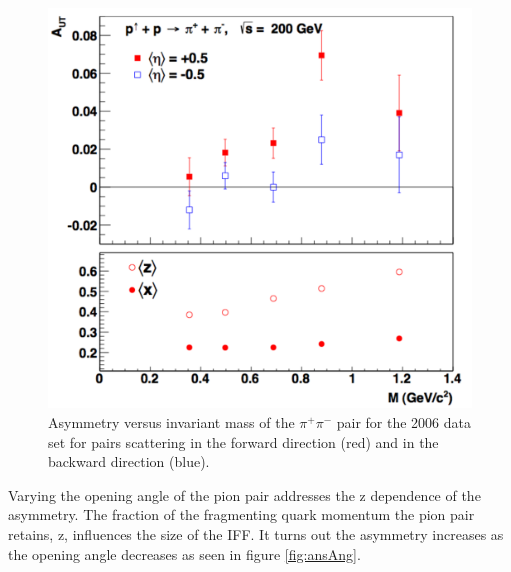 \documentclass[abstract = on,listof=totoc, bibliography=totoc]{scrreprt}
\newcommand{\pip}{\pi^+}
\newcommand{\pim}{\pi^-}
\newcommand{\pair}{$\pip\pim$ }
\begin{document}
 \begin{figure}
\begin{center}
\includegraphics[width = 1\textwidth]{ansM_new}
\caption[$A_{UT}$ vs Invariant Mass in 2006 data set]{Asymmetry versus invariant mass of the \pair pair for the 2006 data set for pairs scattering in the forward direction (red) and in the backward direction (blue).}
\label{fig:ansM}
\end{center}
\end{figure}


Varying the opening angle of the pion pair addresses the z dependence of the asymmetry. The fraction of the fragmenting quark momentum the pion pair retains, z, influences the size of the IFF. It turns out the asymmetry increases as the opening angle decreases as seen in figure \ref{fig:ansAng}.
\end{document}
